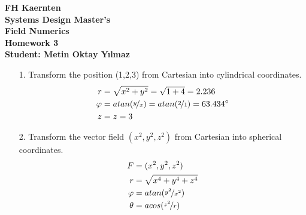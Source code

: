 \documentclass[12pt,a4paper]{report}
\begin{document}
    \begin{center}
        \textbf {FH Kaernten\\
        \vspace{5mm}
        Systems Design Master's\\
        Field Numerics\\
        Homework 3\\
        \vspace{5mm}
        Student: Metin Oktay Yılmaz\\
        \vspace{5mm}}
    \end{center}

    \begin{itemize}
        \item[1.] Transform the position (1,2,3) from Cartesian into
        cylindrical coordinates.
        \begin{align}
            r &= \sqrt{x^2+y^2} = \sqrt{1 + 4} = 2.236 \\
            \varphi &= atan(\nicefrac{y}{x}) = atan(\nicefrac{2}{1}) =
            63.434
            \degree \\
            z &= z = 3
        \end{align}

        \item[2.] Transform the vector field $(x^2, y^2, z^2)$ from Cartesian
        into spherical coordinates.
        \begin{align}
        F &= (x^2, y^2, z^2)\\
        r &= \sqrt{x^4+y^4+z^4}\\
        \varphi &= atan(\nicefrac{y^2}{x^2})\\
        \theta &= acos(\nicefrac{z^2}{r})
        \end{align}
    \end{itemize}
\end{document}
